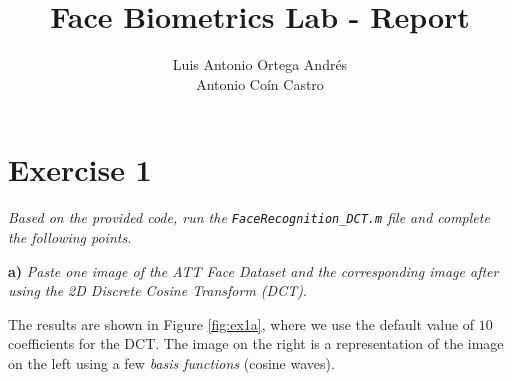 \documentclass[11pt]{article}
\author{Luis Antonio Ortega Andrés\\Antonio Coín Castro}
\date{}
\title{Face Biometrics Lab - Report}
\begin{document}
\maketitle

\section*{Exercise 1}

\textit{Based on the provided code, run the \texttt{FaceRecognition\_DCT.m} file and complete the following points.}

\textbf{a)} \emph{Paste one image of the ATT Face Dataset and the corresponding image after using the 2D Discrete Cosine Transform (DCT)}.

The results are shown in Figure \ref{fig:ex1a}, where we use the default value of $10$ coefficients for the DCT. The image on the right is a representation of the image on the left using a few \textit{basis functions} (cosine waves).
\end{document}
